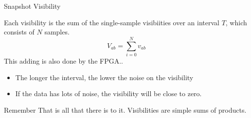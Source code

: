 \documentclass[ignorenonframetext]{beamer}
\begin{document}
\begin{frame}{Snapshot Visibility}

Each visibility is the sum of the single-sample visibiities over an interval $T$, which consists of $N$ samples. 
\[ V_{ab} = \sum_{i=0}^{N} v_{ab} \]
This adding is also done by the FPGA..
\begin{itemize}
 \item The longer the interval, the lower the noise on the visibility
 \item If the data has lots of noise, the visibility will be close to zero.
\end{itemize}


\begin{block}{Remember}
 That is all that there is to it. Visibilities are simple sums of products.
\end{block}
\end{frame}
\end{document}
